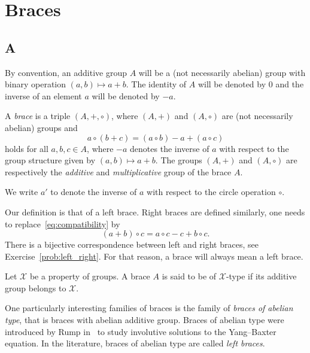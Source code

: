 \chapter{Braces}
\label{braces}

\section*{A}

By convention, an additive group $A$ will be a (not necessarily abelian) group 
with binary operation $(a,b)\mapsto a+b$. The 
identity of $A$ will be denoted by $0$ and the inverse of an element $a$ will be denoted by $-a$. 

\begin{definition}
    \label{def:brace}
	A \emph{brace} is a triple $(A,+,\circ)$, where $(A,+)$ and $(A,\circ)$ 
	are (not necessarily abelian) 
	groups and 
	\begin{equation}
	    \label{eq:compatibility}
	    a\circ(b+c)=(a\circ b)-a+(a\circ c)
	\end{equation}
	holds for all $a,b,c\in A$, where $-a$ denotes the inverse of $a$ with
	respect to the group structure given by $(a,b)\mapsto a+b$. The groups 
	$(A,+)$ and $(A,\circ)$ are respectively 
	the \emph{additive} and \emph{multiplicative} group
	of the brace $A$.
\end{definition}

We write $a'$ to denote the inverse of $a$ with respect to the circle operation $\circ$. 

Our definition is that of a left brace. Right braces are defined similarly, one needs 
to replace~\eqref{eq:compatibility} by 
\[
(a+b)\circ c=a\circ c-c+b\circ c.
\]
There is a bijective correspondence between left and right braces, 
see Exercise~\ref{prob:left_right}. For that reason, 
a brace will always mean a left brace. 

\begin{definition}
    Let $\mathcal{X}$ be a property of groups. A brace $A$ is said to be
    of $\mathcal{X}$-type if its additive group belongs to $\mathcal{X}$.
\end{definition}

One particularly interesting families of braces is the family of \emph{braces of abelian type}, 
that is braces with abelian additive group. 
Braces of abelian type were introduced by Rump in~\cite{MR2278047} to study involutive solutions to the Yang--Baxter equation. 
In the literature, braces of abelian type are called \emph{left braces}. 

